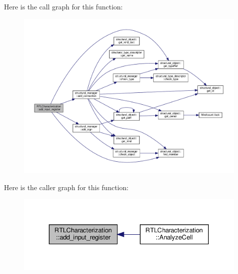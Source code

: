 Here is the call graph for this function\+:
\nopagebreak
\begin{figure}[H]
\begin{center}
\leavevmode
\includegraphics[width=350pt]{d9/d84/classRTLCharacterization_ad2f002aeb10b1a41ff125d87580bc507_cgraph}
\end{center}
\end{figure}
Here is the caller graph for this function\+:
\nopagebreak
\begin{figure}[H]
\begin{center}
\leavevmode
\includegraphics[width=330pt]{d9/d84/classRTLCharacterization_ad2f002aeb10b1a41ff125d87580bc507_icgraph}
\end{center}
\end{figure}
\mbox{\label{classRTLCharacterization_a8da7aeea42687af7ad61a61574874de1}} 
